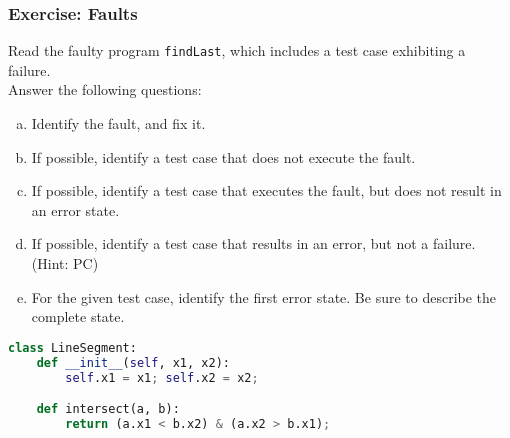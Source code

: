 \documentclass{beamer}
\newenvironment{changemargin}[1]{%
  \begin{list}{}{%
    \setlength{\topsep}{0pt}%
    \setlength{\leftmargin}{#1}%
    \setlength{\rightmargin}{1em}
    \setlength{\listparindent}{\parindent}%
    \setlength{\itemindent}{\parindent}%
    \setlength{\parsep}{\parskip}%
  }%
  \item[]}{\end{list}}
\begin{document}
\begin{frame}

  \frametitle{Exercise: Faults}

  \begin{changemargin}{1cm}
    Read the faulty program {\tt findLast}, which 
    includes a test case exhibiting a failure.\\[1em]

    Answer the following questions:
    \begin{enumerate}[(a)]
    \item Identify the fault, and fix it.
    \item If possible, identify a test case that does not execute the fault.
    \item If possible, identify a test case that executes the fault, but does not result in an error state.
    \item If possible, identify a test case that results in an error, but not a failure. (Hint: PC)
    \item For the given test case, identify the first error state. Be sure to describe the complete state.
      \end{enumerate}
  \end{changemargin}
\end{frame}

\begin{frame}[fragile]
  \begin{lstlisting}[language=Python]
  class LineSegment:
    def __init__(self, x1, x2):
        self.x1 = x1; self.x2 = x2;

    def intersect(a, b):
        return (a.x1 < b.x2) & (a.x2 > b.x1);
  \end{lstlisting}
  
\end{frame}
\end{document}
